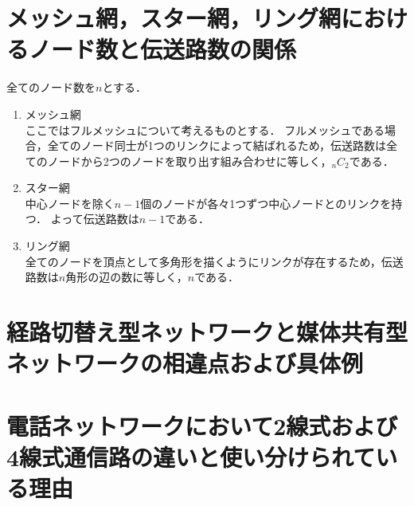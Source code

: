 \documentclass[10.5pt]{jsarticle}
\begin{document}
\section{メッシュ網，スター網，リング網におけるノード数と伝送路数の関係}
全てのノード数を$n$とする．
\begin{enumerate}
\item{メッシュ網}\\
ここではフルメッシュについて考えるものとする．
フルメッシュである場合，全てのノード同士が1つのリンクによって結ばれるため，伝送路数は全てのノードから2つのノードを取り出す組み合わせに等しく，\underline{${}_nC_2$}である．
\item{スター網}\\
中心ノードを除く$n-1$個のノードが各々1つずつ中心ノードとのリンクを持つ．
よって伝送路数は\underline{$n-1$}である．
\item{リング網}\\
全てのノードを頂点として多角形を描くようにリンクが存在するため，伝送路数は$n$角形の辺の数に等しく，\underline{$n$}である．
\end{enumerate}

\section{経路切替え型ネットワークと媒体共有型ネットワークの相違点および具体例}


\section{電話ネットワークにおいて2線式および4線式通信路の違いと使い分けられている理由}


\section{}
\section{}
\section{}
\section{}
\section{}
\section{}
\end{document}
